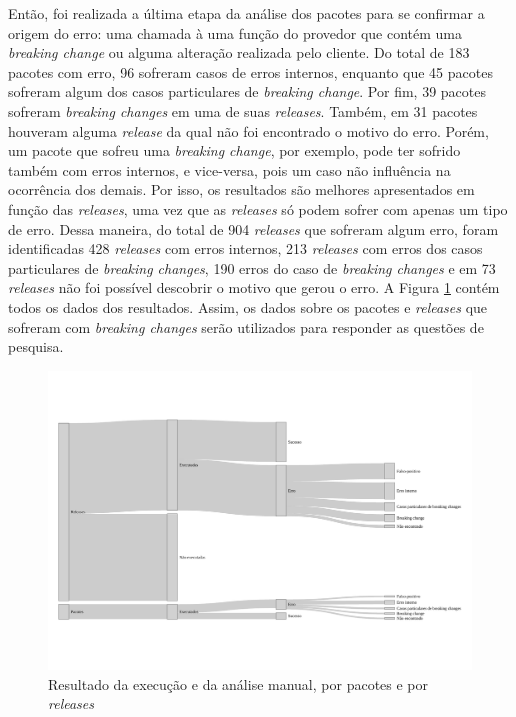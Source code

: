 Então, foi realizada a última etapa da análise dos pacotes para se confirmar a origem do erro: uma chamada à uma função do provedor que contém uma \textit{breaking change} ou alguma alteração realizada pelo cliente. Do total de 183 pacotes com erro, 96 sofreram casos de erros internos, enquanto que 45 pacotes sofreram algum dos casos particulares de \textit{breaking change}. Por fim, 39 pacotes sofreram \textit{breaking changes} em uma de suas \textit{releases}. Também, em 31 pacotes houveram alguma \textit{release} da qual não foi encontrado o motivo do erro. Porém, um pacote que sofreu uma \textit{breaking change}, por exemplo, pode ter sofrido também com erros internos, e vice-versa, pois um caso não influência na ocorrência dos demais. Por isso, os resultados são melhores apresentados em função das \textit{releases}, uma vez que as \textit{releases} só podem sofrer com apenas um tipo de erro. Dessa maneira, do total de 904 \textit{releases} que sofreram algum erro, foram identificadas 428 \textit{releases} com erros internos, 213 \textit{releases} com erros dos casos particulares de \textit{breaking changes}, 190 erros do caso de \textit{breaking changes} e em 73 \textit{releases} não foi possível descobrir o motivo que gerou o erro. A Figura \ref{fig:res_rq1_g} contém todos os dados dos resultados. Assim, os dados sobre os pacotes e \textit{releases} que sofreram com \textit{breaking changes} serão utilizados para responder as questões de pesquisa.

\begin{figure}
    \centering
    \includegraphics[scale=0.5]{figuras/general_results.pdf}
    \caption{Resultado da execução e da análise manual, por pacotes e por \textit{releases}}
    \label{fig:res_rq1_g}
\end{figure}{}